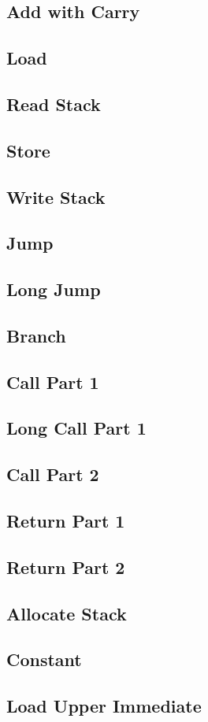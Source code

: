\documentclass{report}
\begin{document}
		\subsection{Add with Carry}
		\subsection{Load}
		\subsection{Read Stack}
		\subsection{Store}
		\subsection{Write Stack}
		\subsection{Jump}
		\subsection{Long Jump}
		\subsection{Branch}
		\subsection{Call Part 1}

			


		\subsection{Long Call Part 1}
		\subsection{Call Part 2}
		\subsection{Return Part 1}
		\subsection{Return Part 2}
		\subsection{Allocate Stack}
		\subsection{Constant}
		\subsection{Load Upper Immediate}
\end{document}
